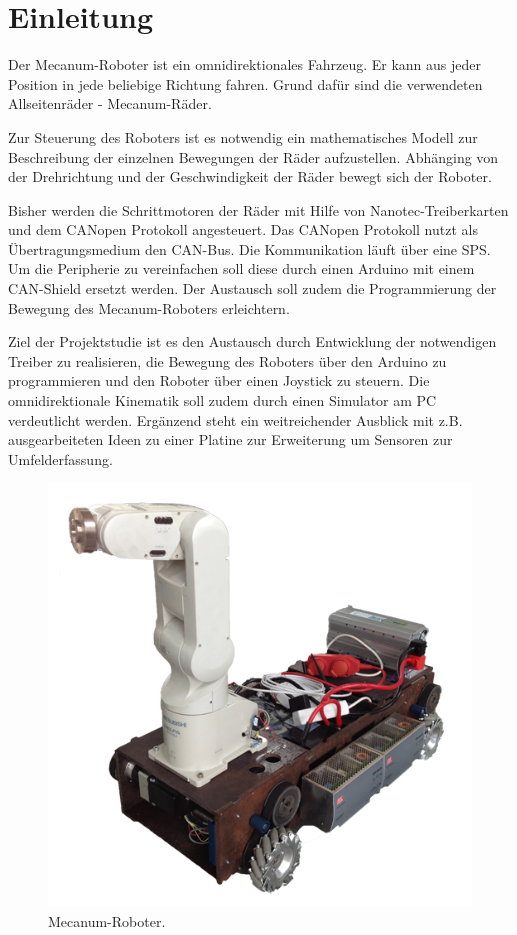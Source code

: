 
\section{Einleitung}

Der Mecanum-Roboter ist ein omnidirektionales Fahrzeug. Er kann aus jeder Position in jede beliebige Richtung fahren. Grund dafür sind die verwendeten Allseitenräder - Mecanum-Räder. 

Zur Steuerung des Roboters ist es notwendig ein mathematisches Modell zur Beschreibung der einzelnen Bewegungen der Räder aufzustellen. Abhänging von der Drehrichtung und der Geschwindigkeit der Räder bewegt sich der Roboter.

Bisher werden die Schrittmotoren der Räder mit Hilfe von Nanotec-Treiberkarten und dem CANopen Protokoll angesteuert. Das CANopen Protokoll nutzt als Übertragungsmedium den CAN-Bus. Die Kommunikation läuft über eine SPS. Um die Peripherie zu vereinfachen soll diese durch einen Arduino mit einem CAN-Shield ersetzt werden. Der Austausch soll zudem die Programmierung der Bewegung des Mecanum-Roboters erleichtern.

Ziel der Projektstudie ist es den Austausch durch Entwicklung der notwendigen Treiber zu realisieren, die Bewegung des Roboters über den Arduino zu programmieren und den Roboter über einen Joystick zu steuern. Die omnidirektionale Kinematik soll zudem durch einen Simulator am PC verdeutlicht werden. Ergänzend steht ein weitreichender Ausblick mit z.B.  ausgearbeiteten Ideen zu einer Platine zur Erweiterung um Sensoren zur Umfelderfassung. 

\newpage
\begin{figure}[H]
\centering
 \includegraphics[width=.6\textwidth]{Abbildungen/Roboter} 
\caption[Mecanum-Roboter]{Mecanum-Roboter.}
\label{fig:Roboter}
\end{figure}

